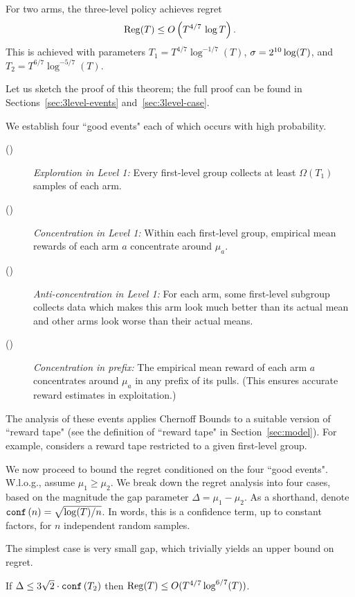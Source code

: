 \begin{theorem}
\label{thm:3level}
For two arms, the three-level policy
achieves regret
\[ \mathrm{Reg}(T) \leq O\left( T^{4/7}\, \log T \right).\]
This is achieved with parameters
    $T_1 = T^{4/7}\log^{-1/7}(T)$,
    $\sigma = 2^{10}\log(T)$, and
    $T_2 = T^{6/7}\log^{-5/7}(T)$.
\end{theorem}

Let us sketch the proof of this theorem; the full proof can be found in Sections~\ref{sec:3level-events} and~\ref{sec:3level-case}.

We establish four ``good events" each of which occurs with high probability.
\begin{description}
\item[()] \emph{Exploration in Level 1:} Every first-level group collects at least $\Omega(T_1)$ samples of each arm.
\item[()] \emph{Concentration in Level 1:} Within each first-level group, empirical mean rewards of each arm $a$ concentrate around $\mu_a$.
\item[()] \emph{Anti-concentration in Level 1:} For each arm, some first-level subgroup collects data which makes this arm look much better than its actual mean and other arms look worse than their actual means.
\item[()] \emph{Concentration in prefix:}
The empirical mean reward of each arm $a$ concentrates around $\mu_a$ in any prefix of its pulls. (This ensures accurate reward estimates in exploitation.)
\end{description}

The analysis of these events applies Chernoff Bounds to a suitable version of ``reward tape" (see the definition of ``reward tape" in Section~\ref{sec:model}). For example,  considers a reward tape restricted to a given first-level group.

We now proceed to bound the regret conditioned on the four ``good events". W.l.o.g., assume $\mu_1 \geq \mu_2$. We break down the regret analysis into four cases, based on the magnitude the gap parameter $\Delta = \mu_1-\mu_2$. As a shorthand, denote
    $\mathtt{conf}\left(n\right) = \sqrt{\log(T)/n}$.
In words, this is a confidence term, up to constant factors, for $n$ independent random samples.

The simplest case is very small gap, which trivially yields an upper bound on regret.

\begin{claim}
If
    $\Delta \leq 3\sqrt{2}\cdot  \mathtt{conf}\left(T_2\right)$
then
  $\mathrm{Reg}(T)\leq O(T^{4/7} \log^{6/7}(T))$.
\end{claim}

